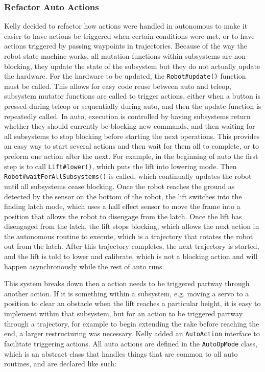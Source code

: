 \documentclass{article}
\begin{document}
\subsubsection{Refactor Auto Actions}
Kelly decided to refactor how actions were handled in autonomous to make it easier to have actions be triggered when certain conditions were met, or to have actions triggered by passing waypoints in trajectories. Because of the way the robot state machine works, all mutation functions within subsystems are non-blocking, they update the state of the subsystem but they do not actually update the hardware. For the hardware to be updated, the \texttt{Robot\#update()} function must be called. This allows for easy code reuse between auto and teleop, subsystem mutator functions are called to trigger actions, either when a button is pressed during teleop or sequentially during auto, and then the update function is repeatedly called. In auto, execution is controlled by having subsystems return whether they should currently be blocking new commands, and then waiting for all subsystems to stop blocking before starting the next operations. This provides an easy way to start several actions and then wait for them all to complete, or to preform one action after the next. For example, in the beginning of auto the first step is to call \texttt{Lift\#lower()}, which puts the lift into lowering mode. Then \texttt{Robot\#waitForAllSubsystems()} is called, which continually updates the robot until all subsystems cease blocking. Once the robot reaches the ground as detected by the sensor on the bottom of the robot, the lift switches into the finding latch mode, which uses a hall effect sensor to move the frame into a position that allows the robot to disengage from the latch. Once the lift has disengaged from the latch, the lift stops blocking, which allows the next action in the autonomous routine to execute, which is a trajectory that rotates the robot out from the latch. After this trajectory completes, the next trajectory is started, and the lift is told to lower and calibrate, which is not a blocking action and will happen asynchronously while the rest of auto runs. 

This system breaks down then a action needs to be triggered partway through another action. If it is something within a subsystem, e.g. moving a servo to a position to clear an obstacle when the lift reaches a particular height, it is easy to implement within that subsystem, but for an action to be triggered partway through a trajectory, for example to begin extending the rake before reaching the end, a larger restructuring was necessary. Kelly added an \texttt{AutoAction} interface to facilitate triggering actions. All auto actions are defined in the \texttt{AutoOpMode} class, which is an abstract class that handles things that are common to all auto routines, and are declared like such:
\end{document}
